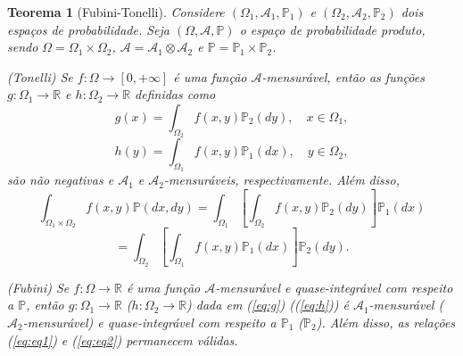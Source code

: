 \documentclass[12pt,a4paper,answers]{article}
\numberwithin{equation}{section} %
\theoremstyle{thm_estilo}
\newtheorem{theorem}{Teorema}[section]
\theoremstyle{thm_note_est}
\begin{document}
\begin{theorem}[Fubini-Tonelli]
	Considere $(\Omega_1, \mathcal{A}_1, \mathbb{P}_1)$ e $(\Omega_2, \mathcal{A}_2, \mathbb{P}_2)$ dois espaços de probabilidade. Seja $(\Omega, \mathcal{A}, \mathbb{P})$ o espaço de probabilidade produto, sendo $\Omega = \Omega_1 \times \Omega_2$, $\mathcal{A} = \mathcal{A}_1 \otimes \mathcal{A}_2$ e $\mathbb{P} = \mathbb{P}_1 \times \mathbb{P}_2$.
	
	\begin{outline}
		\1[(a)](\textit{Tonelli}) Se $f : \Omega \rightarrow [0, +\infty]$ é uma função $\mathcal{A}$-mensurável, então as funções $g : \Omega_1 \rightarrow \mathbb{R}$ e $h : \Omega_2 \rightarrow \mathbb{R}$ definidas como
		\begin{equation}\label{eq:g}
			g(x) = \int_{\Omega_2} f(x, y)\mathbb{P}_2(dy), \quad x \in \Omega_1,
		\end{equation}
		\begin{equation}\label{eq:h}
			h(y) = \int_{\Omega_1} f(x, y)\mathbb{P}_1(dx), \quad y \in \Omega_2,
		\end{equation}
		são não negativas e $\mathcal{A}_1$ e $\mathcal{A}_2$-mensuráveis, respectivamente. Além disso,
		\begin{equation}\label{eq:eq1}
			\int_{\Omega_1 \times \Omega_2} f(x, y)\mathbb{P}(dx, dy) = \int_{\Omega_1} \left[\int_{\Omega_2} f(x, y) \mathbb{P}_2(dy)\right] \mathbb{P}_1(dx)
		\end{equation}
		\begin{equation}\label{eq:eq2}
			= \int_{\Omega_2} \left[\int_{\Omega_1} f(x, y)\mathbb{P}_1(dx)\right] \mathbb{P}_2(dy).
		\end{equation}
		
		\1[(b)] (\textit{Fubini}) Se $f : \Omega \rightarrow \mathbb{R}$ é uma função $\mathcal{A}$-mensurável e quase-integrável com respeito a $\mathbb{P}$, então $g : \Omega_1 \rightarrow \mathbb{R}$ ($h : \Omega_2 \rightarrow \mathbb{R}$) dada em (\ref{eq:g}) ((\ref{eq:h})) é $\mathcal{A}_1$-mensurável ($\mathcal{A}_2$-mensurável) e quase-integrável com respeito a $\mathbb{P}_1$ ($\mathbb{P}_2$). Além disso, as relações (\ref{eq:eq1}) e (\ref{eq:eq2}) permanecem válidas.
	\end{outline}
\end{theorem}
\end{document}
